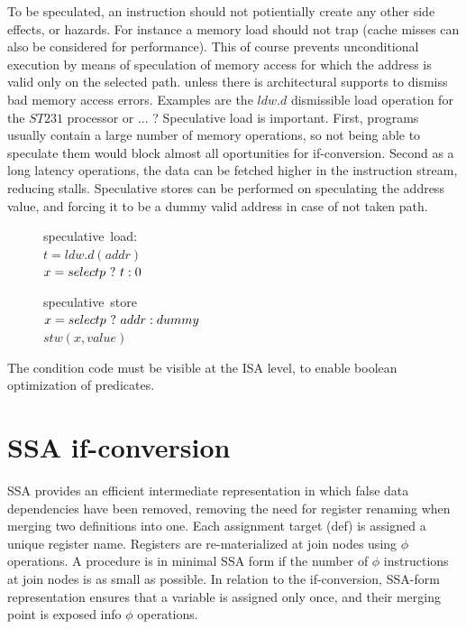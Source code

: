To be speculated, an instruction should not potientially create any other side effects, or hazards. For instance a memory load should not trap (cache misses can also be considered for performance). This of course prevents unconditional execution by means of speculation of memory access for which the address is valid only on the selected path. unless there is architectural supports to dismiss bad memory access errors. Examples are the $ldw.d$ dismissible load operation for the $ST231$ processor or ... ? 
Speculative load is important. First, programs usually contain a large number of memory operations, so not being able to speculate them would block almost all oportunities for if-conversion. Second as a long latency operations, the data can be fetched higher in the instruction stream, reducing stalls.
Speculative stores can be performed on speculating the address value, and forcing it to be a dummy valid address in case of not taken path.

\begin{figure}
\begin{minipage}[t]{4cm}
\mbox{speculative load:} \\
$t = ldw.d(addr) $ \\
$x = select p ~?~ t : 0 $ \\
\end{minipage}
\begin{minipage}[t]{4cm}
\mbox{speculative store} \\
$x=select p ~?~ addr : dummy $ \\
$stw (x, value) $
\end{minipage}
\label{fig:spec}
\end{figure}

The condition code must be visible at the ISA level, to enable boolean optimization of predicates.

\section{SSA if-conversion}

SSA provides an efficient intermediate representation in which false data dependencies have been removed, removing the need for register renaming when merging two definitions into one. Each assignment target (def) is assigned a unique register name. Registers are re-materialized at join nodes using $\phi$ operations. A procedure is in minimal SSA form if the number of $\phi$ instructions at join nodes is as small as possible. In relation to the if-conversion, SSA-form representation ensures that a variable is assigned only once, and their merging point is exposed info $\phi$ operations.

